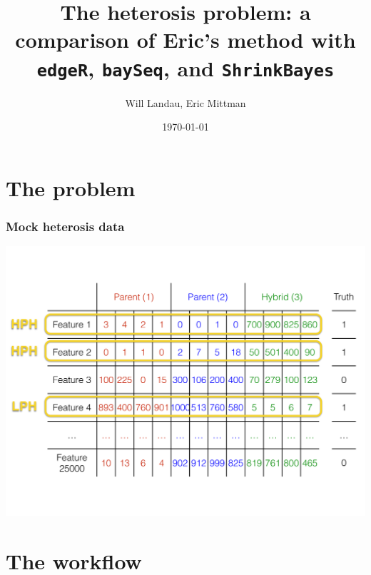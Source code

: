\documentclass[handout]{beamer}
\title{The heterosis problem: a comparison of Eric's method with {\tt edgeR}, {\tt baySeq}, and {\tt ShrinkBayes}}
\author{Will Landau, Eric Mittman}
\date{\today}
\institute{Iowa State University}
\numberwithin{equation}{section}
\begin{document}
\begin{frame}
\titlepage
\end{frame}


\section{The problem}

\begin{frame}
\frametitle{Mock heterosis data}
\begin{center}
\includegraphics[scale=.28]{data}
\end{center}
\end{frame}

\section{The workflow}
\end{document}

